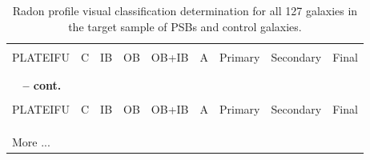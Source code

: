 \begin{longtable}{p{2.1cm}p{0.8cm}p{0.8cm}p{0.8cm}p{0.8cm}p{0.8cm}p{1.5cm}p{1.5cm}p{1.2cm}}
\caption[Radon profile visual classification of PSBs and controls]{Radon profile visual classification determination for all 127 galaxies in the target sample of PSBs and control galaxies.}
\label{tab:full-visual-classification} \\

\hline
\\
PLATEIFU & C & IB & OB & OB+IB & A & Primary & Secondary & Final \\
\\
\hline
\\
\endfirsthead
%
{{\bfseries \tablename\ \thetable{} -- cont.}}
\\
\hline
\\
PLATEIFU & C & IB & OB & OB+IB & A & Primary & Secondary & Final \\
\\
\hline
\\
\endhead

\\
\hline 
{{More ...}}
\endfoot
\hline
\endlastfoot


\end{longtable}
